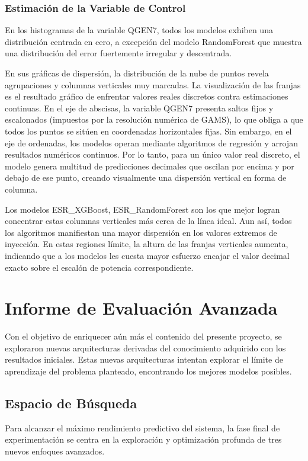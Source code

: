 \subsubsection{Estimación de la Variable de Control}
En los histogramas de la variable QGEN7, todos los modelos exhiben una distribución centrada en cero, a excepción del modelo RandomForest que muestra una distribución del error fuertemente irregular y descentrada.

En sus gráficas de dispersión, la distribución de la nube de puntos revela agrupaciones y columnas verticales muy marcadas. La visualización de las franjas es el resultado gráfico de enfrentar valores reales discretos contra estimaciones continuas. En el eje de abscisas, la variable QGEN7 presenta saltos fijos y escalonados (impuestos por la resolución numérica de GAMS), lo que obliga a que todos los puntos se sitúen en coordenadas horizontales fijas. Sin embargo, en el eje de ordenadas, los modelos operan mediante algoritmos de regresión y arrojan resultados numéricos continuos. Por lo tanto, para un único valor real discreto, el modelo genera multitud de predicciones decimales que oscilan por encima y por debajo de ese punto, creando visualmente una dispersión vertical en forma de columna.

Los modelos ESR\_XGBoost, ESR\_RandomForest son los que mejor logran concentrar estas columnas verticales más cerca de la línea ideal. Aun así, todos los algoritmos manifiestan una mayor dispersión en los valores extremos de inyección. En estas regiones límite, la altura de las franjas verticales aumenta, indicando que a los modelos les cuesta mayor esfuerzo encajar el valor decimal exacto sobre el escalón de potencia correspondiente.

\section{Informe de Evaluación Avanzada}
Con el objetivo de enriquecer aún más el contenido del presente proyecto, se exploraron nuevas arquitecturas derivadas del conocimiento adquirido con los resultados iniciales. Estas nuevas arquitecturas intentan explorar el límite de aprendizaje del problema planteado, encontrando los mejores modelos posibles. 

\subsection{Espacio de Búsqueda}
Para alcanzar el máximo rendimiento predictivo del sistema, la fase final de experimentación se centra en la exploración y optimización profunda de tres nuevos enfoques avanzados. 

